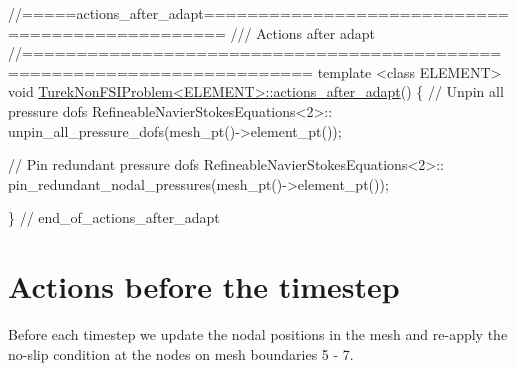 \begin{DoxyCodeInclude}
\textcolor{comment}{//=====actions\_after\_adapt================================================}
\textcolor{comment}{/// Actions after adapt}
\textcolor{comment}{}\textcolor{comment}{//========================================================================}
\textcolor{keyword}{template} <\textcolor{keyword}{class} ELEMENT> 
\textcolor{keywordtype}{void} \hyperlink{classTurekNonFSIProblem_a88ed5ef8b1be34f5176c29ffec20eedd}{TurekNonFSIProblem<ELEMENT>::actions\_after\_adapt}()
\{
 \textcolor{comment}{// Unpin all pressure dofs}
 RefineableNavierStokesEquations<2>::
  unpin\_all\_pressure\_dofs(mesh\_pt()->element\_pt());
 
 \textcolor{comment}{// Pin redundant pressure dofs}
 RefineableNavierStokesEquations<2>::
  pin\_redundant\_nodal\_pressures(mesh\_pt()->element\_pt());
 
\} \textcolor{comment}{// end\_of\_actions\_after\_adapt}

\end{DoxyCodeInclude}




 

\hypertarget{index_timestep}{}\section{Actions before the timestep}\label{index_timestep}
Before each timestep we update the nodal positions in the mesh and re-\/apply the no-\/slip condition at the nodes on mesh boundaries 5 -\/ 7.


